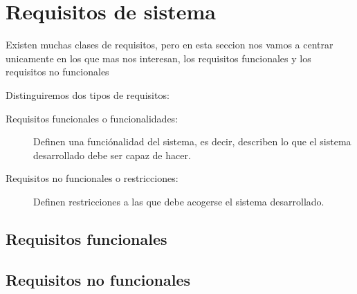 \chapter{Requisitos de sistema}
    Existen muchas clases de requisitos, pero en esta seccion nos vamos a centrar unicamente en los que mas nos interesan, los requisitos funcionales y los requisitos no funcionales
    
    Distinguiremos dos tipos de requisitos:
    \begin{description}
        \item[Requisitos funcionales o funcionalidades:]
            Definen una funciónalidad del sistema, es decir, describen lo que el sistema desarrollado debe ser capaz de hacer.
        \item[Requisitos no funcionales o restricciones:]
            Definen restricciones a las que debe acogerse el sistema desarrollado.
  
    \end{description}
  

\section{Requisitos funcionales}
    

\section{Requisitos no funcionales}
    

%    
